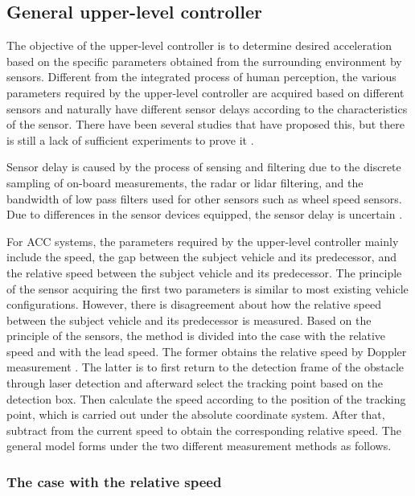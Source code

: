 \documentclass[journal]{IEEEtran}
\begin{document}
\subsection{General upper-level controller}
\label{Section 2.2}

The objective of the upper-level controller is to determine desired acceleration based on the specific parameters obtained from the surrounding environment by sensors. Different from the integrated process of human perception, the various parameters required by the upper-level controller are acquired based on different sensors and naturally have different sensor delays according to the characteristics of the sensor. There have been several studies that have proposed this, but there is still a lack of sufficient experiments to prove it \citep{Ngoduy2013a,Yao2021}.

Sensor delay is caused by the process of sensing and filtering due to the discrete sampling of on-board measurements, the radar or lidar filtering, and the bandwidth of low pass filters used for other sensors such as wheel speed sensors. Due to differences in the sensor devices equipped, the sensor delay is uncertain \citep{Loke2019}.

For ACC systems, the parameters required by the upper-level controller mainly include the speed, the gap between the subject vehicle and its predecessor, and the relative speed between the subject vehicle and its predecessor. The principle of the sensor acquiring the first two parameters is similar to most existing vehicle configurations. However, there is disagreement about how the relative speed between the subject vehicle and its predecessor is measured. Based on the principle of the sensors, the method is divided into the case with the relative speed and with the lead speed. The former obtains the relative speed by Doppler measurement \citep{pinson2016relative}. The latter is to first return to the detection frame of the obstacle through laser detection and afterward select the tracking point based on the detection box. Then calculate the speed according to the position of the tracking point, which is carried out under the absolute coordinate system. After that, subtract from the current speed to obtain the corresponding relative speed. The general model forms under the two different measurement methods as follows.

\subsubsection{The case with the relative speed}
\label{Section 2.2.1}
\end{document}
